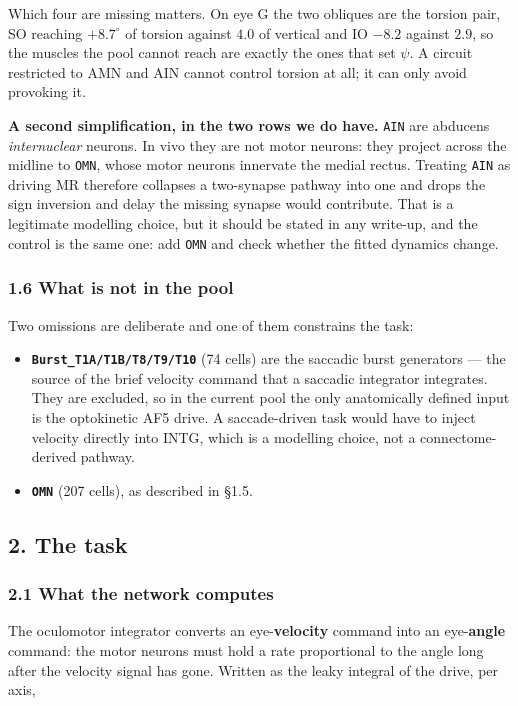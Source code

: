 \documentclass[10pt]{article}
\begin{document}
Which four are missing matters. On eye G the two obliques are the torsion pair, SO reaching
$+8.7^{\circ}$ of torsion against $4.0$ of vertical and IO $-8.2$ against $2.9$, so the
muscles the pool cannot reach are exactly the ones that set $\psi$. A circuit restricted to
AMN and AIN cannot control torsion at all; it can only avoid provoking it.

\textbf{A second simplification, in the two rows we do have.} \texttt{AIN} are abducens
\emph{internuclear} neurons. In vivo they are not motor neurons: they project across the
midline to \texttt{OMN}, whose motor neurons innervate the medial rectus. Treating
\texttt{AIN} as driving MR therefore collapses a two-synapse pathway into one and drops the
sign inversion and delay the missing synapse would contribute. That is a legitimate
modelling choice, but it should be stated in any write-up, and the control is the same one:
add \texttt{OMN} and check whether the fitted dynamics change.

\subsubsection*{1.6 What is not in the pool}

Two omissions are deliberate and one of them constrains the task:

\begin{itemize}\setlength{\itemsep}{1pt}
\item \textbf{\texttt{Burst\_T1A/T1B/T8/T9/T10}} (74 cells) are the saccadic burst
generators --- the source of the brief velocity command that a saccadic integrator
integrates. They are excluded, so in the current pool the only anatomically defined input is
the optokinetic AF5 drive. A saccade-driven task would have to inject velocity directly into
INTG, which is a modelling choice, not a connectome-derived pathway.
  \item \textbf{\texttt{OMN}} (207 cells), as described in \S{}1.5.
\end{itemize}

\subsection*{2. The task}

\subsubsection*{2.1 What the network computes}

The oculomotor integrator converts an eye-\textbf{velocity} command into an
eye-\textbf{angle} command: the motor neurons must hold a rate proportional to the angle
long after the velocity signal has gone. Written as the leaky integral of the drive, per
axis,
\end{document}
